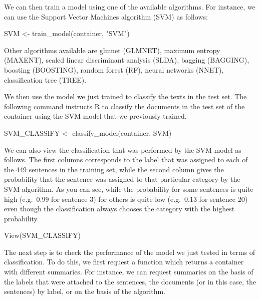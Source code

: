 \documentclass[
]{book}
\newenvironment{Shaded}{\begin{snugshade}}{\end{snugshade}}
\newcommand{\FunctionTok}[1]{\textcolor[rgb]{0.00,0.00,0.00}{#1}}
\newcommand{\NormalTok}[1]{#1}
\newcommand{\OtherTok}[1]{\textcolor[rgb]{0.56,0.35,0.01}{#1}}
\newcommand{\StringTok}[1]{\textcolor[rgb]{0.31,0.60,0.02}{#1}}
\begin{document}
We can then train a model using one of the available algorithms. For instance, we can use the Support Vector Machines algorithm (SVM) as follows:

\begin{Shaded}
\begin{Highlighting}[]
\NormalTok{SVM }\OtherTok{\textless{}{-}} \FunctionTok{train\_model}\NormalTok{(container, }\StringTok{"SVM"}\NormalTok{)}
\end{Highlighting}
\end{Shaded}

Other algorithms available are glmnet (GLMNET), maximum entropy (MAXENT), scaled linear discriminant analysis (SLDA), bagging (BAGGING), boosting (BOOSTING), random forest (RF), neural networks (NNET), classification tree (TREE).

We then use the model we just trained to classify the texts in the test set. The following command instructs R to classify the documents in the test set of the container using the SVM model that we previously trained.

\begin{Shaded}
\begin{Highlighting}[]
\NormalTok{SVM\_CLASSIFY }\OtherTok{\textless{}{-}} \FunctionTok{classify\_model}\NormalTok{(container, SVM)}
\end{Highlighting}
\end{Shaded}

We can also view the classification that was performed by the SVM model as follows. The first columns corresponds to the label that was assigned to each of the 449 sentences in the training set, while the second column gives the probability that the sentence was assigned to that particular category by the SVM algorithm. As you can see, while the probability for some sentences is quite high (e.g.~0.99 for sentence 3) for others is quite low (e.g.~0.13 for sentence 20) even though the classification always chooses the category with the highest probability.

\begin{Shaded}
\begin{Highlighting}[]
\FunctionTok{View}\NormalTok{(SVM\_CLASSIFY)}
\end{Highlighting}
\end{Shaded}

The next step is to check the performance of the model we just tested in terms of classification. To do this, we first request a function which returns a container with different summaries. For instance, we can request summaries on the basis of the labels that were attached to the sentences, the documents (or in this case, the sentences) by label, or on the basis of the algorithm.
\end{document}

